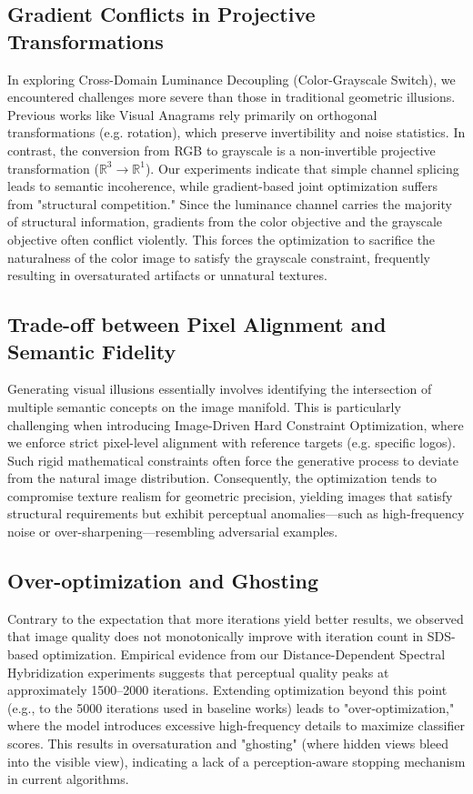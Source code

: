 \documentclass{article}
\begin{document}
\subsection{Gradient Conflicts in Projective Transformations}
In exploring Cross-Domain Luminance Decoupling (Color-Grayscale Switch), we encountered challenges more severe than those in traditional geometric illusions. Previous works like Visual Anagrams\cite{geng2024visual} rely primarily on orthogonal transformations (e.g. rotation), which preserve invertibility and noise statistics. In contrast, the conversion from RGB to grayscale is a non-invertible projective transformation ($\mathbb{R}^3 \to \mathbb{R}^1$). Our experiments indicate that simple channel splicing leads to semantic incoherence, while gradient-based joint optimization suffers from "structural competition." Since the luminance channel carries the majority of structural information, gradients from the color objective and the grayscale objective often conflict violently. This forces the optimization to sacrifice the naturalness of the color image to satisfy the grayscale constraint, frequently resulting in oversaturated artifacts or unnatural textures.

\subsection{Trade-off between Pixel Alignment and Semantic Fidelity}
Generating visual illusions essentially involves identifying the intersection of multiple semantic concepts on the image manifold. This is particularly challenging when introducing Image-Driven Hard Constraint Optimization, where we enforce strict pixel-level alignment with reference targets (e.g. specific logos). Such rigid mathematical constraints often force the generative process to deviate from the natural image distribution. Consequently, the optimization tends to compromise texture realism for geometric precision, yielding images that satisfy structural requirements but exhibit perceptual anomalies—such as high-frequency noise or over-sharpening—resembling adversarial examples.

\subsection{Over-optimization and Ghosting}
Contrary to the expectation that more iterations yield better results, we observed that image quality does not monotonically improve with iteration count in SDS-based optimization. Empirical evidence from our Distance-Dependent Spectral Hybridization experiments suggests that perceptual quality peaks at approximately 1500–2000 iterations. Extending optimization beyond this point (e.g., to the 5000 iterations used in baseline works) leads to "over-optimization," where the model introduces excessive high-frequency details to maximize classifier scores. This results in oversaturation and "ghosting" (where hidden views bleed into the visible view), indicating a lack of a perception-aware stopping mechanism in current algorithms.
\end{document}
